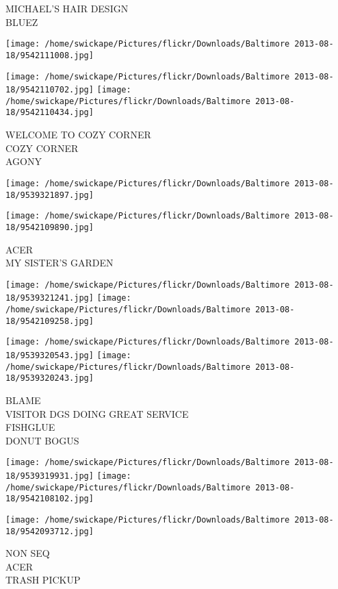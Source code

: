 \documentclass[10pt,letterpaper]{article}
\begin{document}
MICHAEL'S HAIR DESIGN\\
BLUEZ
\pagebreak

\texttt{[image: /home/swickape/Pictures/flickr/Downloads/Baltimore 2013-08-18/9542111008.jpg]}

\vspace{0.25in}
\texttt{[image: /home/swickape/Pictures/flickr/Downloads/Baltimore 2013-08-18/9542110702.jpg]}
\texttt{[image: /home/swickape/Pictures/flickr/Downloads/Baltimore 2013-08-18/9542110434.jpg]}

WELCOME TO COZY CORNER\\
COZY CORNER\\
AGONY
\pagebreak

\texttt{[image: /home/swickape/Pictures/flickr/Downloads/Baltimore 2013-08-18/9539321897.jpg]}

\vspace{0.25in}
\texttt{[image: /home/swickape/Pictures/flickr/Downloads/Baltimore 2013-08-18/9542109890.jpg]}

ACER\\
MY SISTER'S GARDEN
\pagebreak

\texttt{[image: /home/swickape/Pictures/flickr/Downloads/Baltimore 2013-08-18/9539321241.jpg]}
\texttt{[image: /home/swickape/Pictures/flickr/Downloads/Baltimore 2013-08-18/9542109258.jpg]}

\texttt{[image: /home/swickape/Pictures/flickr/Downloads/Baltimore 2013-08-18/9539320543.jpg]}
\texttt{[image: /home/swickape/Pictures/flickr/Downloads/Baltimore 2013-08-18/9539320243.jpg]}

BLAME\\
VISITOR DGS DOING GREAT SERVICE\\
FISHGLUE\\
DONUT BOGUS
\pagebreak

\texttt{[image: /home/swickape/Pictures/flickr/Downloads/Baltimore 2013-08-18/9539319931.jpg]}
\texttt{[image: /home/swickape/Pictures/flickr/Downloads/Baltimore 2013-08-18/9542108102.jpg]}

\vspace{0.25in}
\texttt{[image: /home/swickape/Pictures/flickr/Downloads/Baltimore 2013-08-18/9542093712.jpg]}

NON SEQ\\
ACER\\
TRASH PICKUP
\pagebreak
\end{document}
